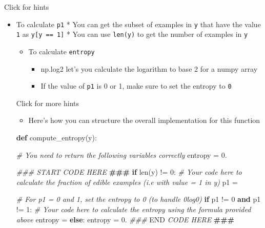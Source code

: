 \documentclass[11pt]{article}
\providecommand{\tightlist}{%
      \setlength{\itemsep}{0pt}\setlength{\parskip}{0pt}}
\newenvironment{Shaded}{}{}
\newcommand{\KeywordTok}[1]{\textcolor[rgb]{0.00,0.44,0.13}{\textbf{{#1}}}}
\newcommand{\DecValTok}[1]{\textcolor[rgb]{0.25,0.63,0.44}{{#1}}}
\newcommand{\FloatTok}[1]{\textcolor[rgb]{0.25,0.63,0.44}{{#1}}}
\newcommand{\CommentTok}[1]{\textcolor[rgb]{0.38,0.63,0.69}{\textit{{#1}}}}
\newcommand{\AlertTok}[1]{\textcolor[rgb]{1.00,0.00,0.00}{\textbf{{#1}}}}
\newcommand{\RegionMarkerTok}[1]{{#1}}
\newcommand{\NormalTok}[1]{{#1}}
\newcommand{\ControlFlowTok}[1]{\textcolor[rgb]{0.00,0.44,0.13}{\textbf{{#1}}}}
\newcommand{\OperatorTok}[1]{\textcolor[rgb]{0.40,0.40,0.40}{{#1}}}
\newcommand{\BuiltInTok}[1]{{#1}}
\begin{document}
    Click for hints

\begin{itemize}
\item
  To calculate \texttt{p1} * You can get the subset of examples in
  \texttt{y} that have the value \texttt{1} as \texttt{y{[}y\ ==\ 1{]}}
  * You can use \texttt{len(y)} to get the number of examples in
  \texttt{y}

  \begin{itemize}
  \tightlist
  \item
    To calculate \texttt{entropy}

    \begin{itemize}
    \tightlist
    \item
      np.log2 let's you calculate the logarithm to base 2 for a numpy
      array
    \item
      If the value of \texttt{p1} is 0 or 1, make sure to set the
      entropy to \texttt{0}
    \end{itemize}
  \end{itemize}

  Click for more hints

  \begin{itemize}
  \tightlist
  \item
    Here's how you can structure the overall implementation for this
    function
  \end{itemize}

\begin{Shaded}
\begin{Highlighting}[]
 \KeywordTok{def}\NormalTok{ compute\_entropy(y):}

     \CommentTok{\# You need to return the following variables correctly}
\NormalTok{     entropy }\OperatorTok{=} \FloatTok{0.}

     \CommentTok{\#\#\# START CODE HERE }\AlertTok{\#\#\#}
     \ControlFlowTok{if} \BuiltInTok{len}\NormalTok{(y) }\OperatorTok{!=} \DecValTok{0}\NormalTok{:}
         \CommentTok{\# Your code here to calculate the fraction of edible examples (i.e with value = 1 in y)}
\NormalTok{         p1 }\OperatorTok{=}

         \CommentTok{\# For p1 = 0 and 1, set the entropy to 0 (to handle 0log0)}
         \ControlFlowTok{if}\NormalTok{ p1 }\OperatorTok{!=} \DecValTok{0} \KeywordTok{and}\NormalTok{ p1 }\OperatorTok{!=} \DecValTok{1}\NormalTok{:}
             \CommentTok{\# Your code here to calculate the entropy using the formula provided above}
\NormalTok{             entropy }\OperatorTok{=} 
         \ControlFlowTok{else}\NormalTok{:}
\NormalTok{             entropy }\OperatorTok{=} \FloatTok{0.} 
     \CommentTok{\#\#\# }\RegionMarkerTok{END}\CommentTok{ CODE HERE }\AlertTok{\#\#\#}\CommentTok{        }


\end{Highlighting}
\end{Shaded}
\end{itemize}
\end{document}

